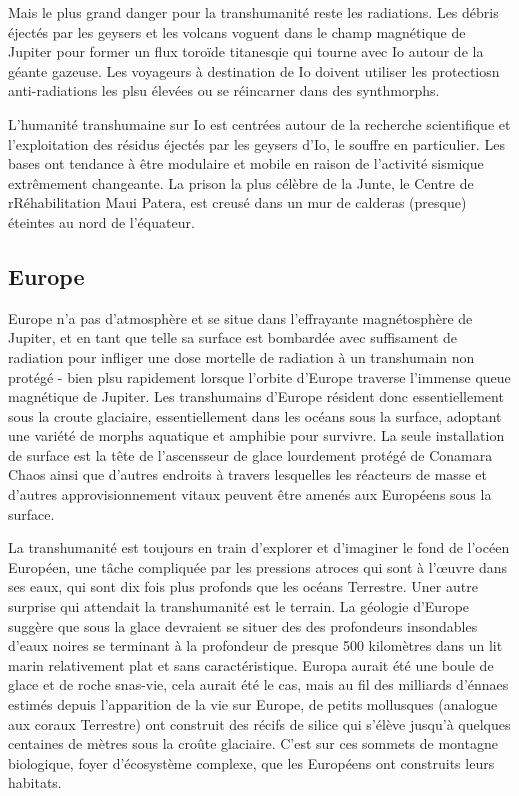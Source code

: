 Mais le plus grand danger pour la transhumanité reste les radiations. Les débris éjectés par les geysers et les volcans voguent dans le champ magnétique de Jupiter pour former un flux toroïde titanesqie qui tourne avec Io autour de la géante gazeuse. Les voyageurs à destination de Io doivent utiliser les protectiosn anti-radiations les plsu élevées ou se réincarner dans des synthmorphs. 

L'humanité transhumaine sur Io est centrées autour de la recherche scientifique et l'exploitation des résidus éjectés par les geysers d'Io, le souffre en particulier. Les bases ont tendance à être modulaire et mobile en raison de l'activité sismique extrêmement changeante. La prison la plus célèbre de la Junte, le Centre de rRéhabilitation Maui Patera, est creusé dans un mur de calderas (presque) éteintes au nord de l'équateur. 

\subsection{Europe} \label{sec:europe} 

Europe n'a pas d'atmosphère et se situe dans l'effrayante magnétosphère de Jupiter, et en tant que telle sa surface est bombardée avec suffisament de radiation pour infliger une dose mortelle de radiation à un transhumain non protégé - bien plsu rapidement lorsque l'orbite d'Europe traverse l'immense queue magnétique de Jupiter. Les transhumains d'Europe résident donc essentiellement sous la croute glaciaire, essentiellement dans les océans sous la surface, adoptant une variété de morphs aquatique et amphibie pour survivre. La seule installation de surface est la tête de l'ascensseur de glace lourdement protégé de Conamara Chaos ainsi que d'autres endroits à travers lesquelles les réacteurs de masse et d'autres approvisionnement vitaux peuvent être amenés aux Européens sous la surface. 

La transhumanité est toujours en train d'explorer et d'imaginer le fond de l'océen Européen, une tâche compliquée par les pressions atroces qui sont à l'œuvre dans ses eaux, qui sont dix fois plus profonds que les océans Terrestre. Uner autre surprise qui attendait la transhumanité est le terrain. La géologie d'Europe suggère que sous la glace devraient se situer des des profondeurs insondables d'eaux noires se terminant à la profondeur de presque 500 kilomètres dans un lit marin relativement plat et sans caractéristique. Europa aurait été une boule de glace et de roche snas-vie, cela aurait été le cas, mais au fil des milliards d'énnaes estimés depuis l'apparition de la vie sur Europe, de petits mollusques (analogue aux coraux Terrestre) ont construit des récifs de silice qui s'élève jusqu'à quelques centaines de mètres sous la croûte glaciaire. C'est sur ces sommets de montagne biologique, foyer d'écosystème complexe, que les Européens ont construits leurs habitats. 

